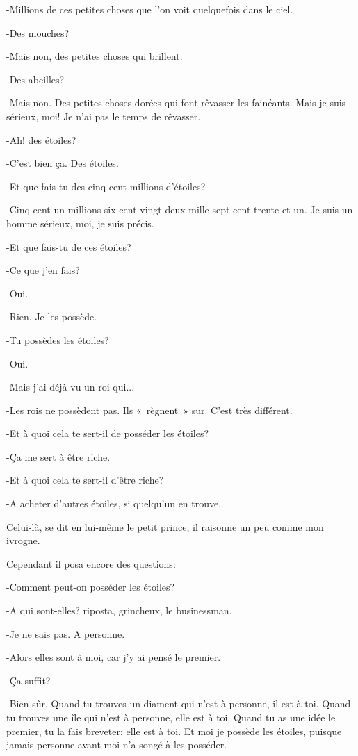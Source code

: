 \documentclass{report}
\begin{document}
-Millions de ces petites choses que l'on voit quelquefois dans le ciel.

-Des mouches?

-Mais non, des petites choses qui brillent.

-Des abeilles?

-Mais non. Des petites choses dorées qui font rêvasser les fainéants. Mais je suis sérieux, moi! Je n'ai pas le temps de rêvasser.

-Ah! des étoiles?

-C'est bien ça. Des étoiles.

-Et que fais-tu des cinq cent millions d'étoiles?

-Cinq cent un millions six cent vingt-deux mille sept cent trente et un. Je suis un homme sérieux, moi, je suis précis.

-Et que fais-tu de ces étoiles?

-Ce que j'en fais?

-Oui.

-Rien. Je les possède.

-Tu possèdes les étoiles?

-Oui.

-Mais j'ai déjà vu un roi qui...

-Les rois ne possèdent pas. Ils «~règnent~» sur. C'est très différent.

-Et à quoi cela te sert-il de posséder les étoiles?

-Ça me sert à être riche.

-Et à quoi cela te sert-il d'être riche?

-A acheter d'autres étoiles, si quelqu'un en trouve.

Celui-là, se dit en lui-même le petit prince, il raisonne un peu comme mon ivrogne.

Cependant il posa encore des questions:

-Comment peut-on posséder les étoiles?

-A qui sont-elles? riposta, grincheux, le businessman.

-Je ne sais pas. A personne.

-Alors elles sont à moi, car j'y ai pensé le premier.

-Ça suffit?

-Bien sûr. Quand tu trouves un diament qui n'est à personne, il est à toi. Quand tu trouves une île qui n'est à personne, elle est à toi. Quand tu as une idée le premier, tu la fais breveter: elle est à toi. Et moi je possède les étoiles, puisque jamais personne avant moi n'a songé à les posséder.
\end{document}

